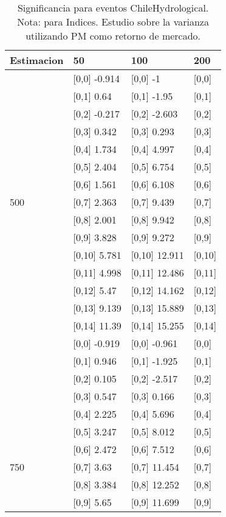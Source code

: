 \begin{table}

\caption{Significancia para eventos ChileHydrological. Nota: para Indices. Estudio sobre la varianza utilizando PM como retorno de mercado.}
\centering
\begin{tabular}[t]{llll}
\toprule
Estimacion & 50 & 100 & 200\\
\midrule
 & {}[0,0] -0.914 & {}[0,0] -1 & {}[0,0]\\
 & {}[0,1] 0.64 & {}[0,1] -1.95 & {}[0,1]\\
 & {}[0,2] -0.217 & {}[0,2] -2.603 & {}[0,2]\\
 & {}[0,3] 0.342 & {}[0,3] 0.293 & {}[0,3]\\
 & {}[0,4] 1.734 & {}[0,4] 4.997 & {}[0,4]\\
\addlinespace
 & {}[0,5] 2.404 & {}[0,5] 6.754 & {}[0,5]\\
 & {}[0,6] 1.561 & {}[0,6] 6.108 & {}[0,6]\\
500 & {}[0,7] 2.363 & {}[0,7] 9.439 & {}[0,7]\\
 & {}[0,8] 2.001 & {}[0,8] 9.942 & {}[0,8]\\
 & {}[0,9] 3.828 & {}[0,9] 9.272 & {}[0,9]\\
\addlinespace
 & {}[0,10] 5.781 & {}[0,10] 12.911 & {}[0,10]\\
 & {}[0,11] 4.998 & {}[0,11] 12.486 & {}[0,11]\\
 & {}[0,12] 5.47 & {}[0,12] 14.162 & {}[0,12]\\
 & {}[0,13] 9.139 & {}[0,13] 15.889 & {}[0,13]\\
 & {}[0,14] 11.39 & {}[0,14] 15.255 & {}[0,14]\\
\addlinespace
 & {}[0,0] -0.919 & {}[0,0] -0.961 & {}[0,0]\\
 & {}[0,1] 0.946 & {}[0,1] -1.925 & {}[0,1]\\
 & {}[0,2] 0.105 & {}[0,2] -2.517 & {}[0,2]\\
 & {}[0,3] 0.547 & {}[0,3] 0.166 & {}[0,3]\\
 & {}[0,4] 2.225 & {}[0,4] 5.696 & {}[0,4]\\
\addlinespace
 & {}[0,5] 3.247 & {}[0,5] 8.012 & {}[0,5]\\
 & {}[0,6] 2.472 & {}[0,6] 7.512 & {}[0,6]\\
750 & {}[0,7] 3.63 & {}[0,7] 11.454 & {}[0,7]\\
 & {}[0,8] 3.384 & {}[0,8] 12.252 & {}[0,8]\\
 & {}[0,9] 5.65 & {}[0,9] 11.699 & {}[0,9]\\

\end{tabular}
\end{table}
